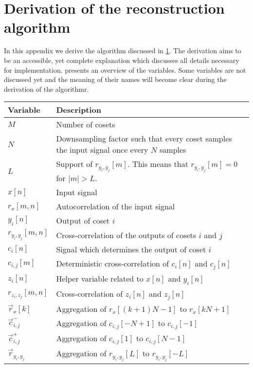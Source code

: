 \documentclass[a4paper, openany, oneside]{memoir}
\begin{document}
\chapter{Derivation of the reconstruction algorithm}
\label{sec:reconstruction-derivation}
In this appendix we derive the algorithm discussed in \cref{sec:reconstruction-derivation}. The derivation aims to be an accessible, yet complete explanation which discusses all details necessary for implementation.  presents an overview of the variables. Some variables are not discussed yet and the meaning of their names will become clear during the derivation of the algorithmr.

\begin{table}[H]
    \centering
    \begin{tabularx}{\textwidth}{lY}
        \textbf{Variable} & \textbf{Description}\\ \hline
        $M$ & Number of cosets \\
        $N$ & Downsampling factor such that every coset samples the input signal once every $N$ samples \\
        $L$ & Support of $r_{y_i,y_j}[m]$. This means that $r_{y_i,y_j}[m]=0$ for $|m| > L$. \\
        $x[n]$ & Input signal \\
        $r_x[m,n]$ & Autocorrelation of the input signal \\
        $y_i[n]$ & Output of coset $i$ \\
        $r_{y_i,y_j}[m,n]$ & Cross-correlation of the outputs of cosets $i$ and $j$ \\
        $c_i[n]$ & Signal which determines the output of coset $i$ \\
        $c_{i,j}[m]$ & Deterministic cross-correlation of $c_i[n]$ and $c_j[n]$ \\
        $z_i[n]$ & Helper variable related to $x[n]$ and $y_i[n]$ \\
        $r_{z_i,z_j}[m,n]$ & Cross-correlation of $z_i[n]$ and $z_j[n]$ \\
        $\vec{r}_x[k]$ & Aggregation of $r_x[(k+1)N-1]$ to $r_x[kN+1]$ \\
        $\vec{c}_{i,j}^-$ & Aggregation of $c_{i,j}[-N+1]$ to $c_{i,j}[-1]$ \\
        $\vec{c}_{i,j}^+$ & Aggregation of $c_{i,j}[1]$ to $c_{i,j}[N-1]$ \\
        $\vec{r}_{y_i,y_j}$ & Aggregation of $r_{y_i,y_j}[L]$ to $r_{y_i,y_j}[-L]$ \\

\end{tabularx}
\end{table}
\end{document}

